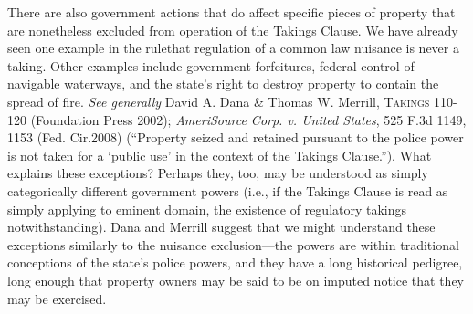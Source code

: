 There are also government actions that do affect specific pieces of property
that are nonetheless excluded from operation of the Takings Clause. We have
already seen one example in the rulethat regulation of a common law
nuisance is never a taking.
Other examples include government forfeitures, federal control of navigable
waterways, and the state's right to destroy property to contain the spread of
fire. \textit{See generally} David A. Dana \& Thomas W. Merrill,
\textsc{Takings} 110-120 (Foundation Press 2002); \emph{AmeriSource Corp. v.
United States}, 525 F.3d 1149, 1153 (Fed. Cir.2008) (``Property seized and
retained pursuant to the police power is not taken for a `public use' in the
context of the Takings Clause.''). What explains these exceptions? Perhaps they,
too, may be understood as simply categorically different government powers
(i.e., if the Takings Clause is read as simply applying to eminent domain, the
existence of regulatory takings notwithstanding). Dana and Merrill suggest that
we might understand these exceptions similarly to the nuisance exclusion---the
powers are within traditional conceptions of the state's police powers, and they
have a long historical pedigree, long enough that property owners may be said to
be on imputed notice that they may be exercised. 

